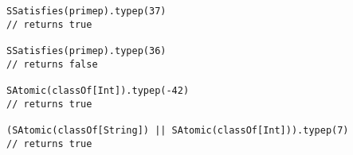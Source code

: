 \begin{lstlisting}[style=scalaioScala]
SSatisfies(primep).typep(37)
// returns true

SSatisfies(primep).typep(36)
// returns false

SAtomic(classOf[Int]).typep(-42) 
// returns true

(SAtomic(classOf[String]) || SAtomic(classOf[Int])).typep(7) 
// returns true
\end{lstlisting}
